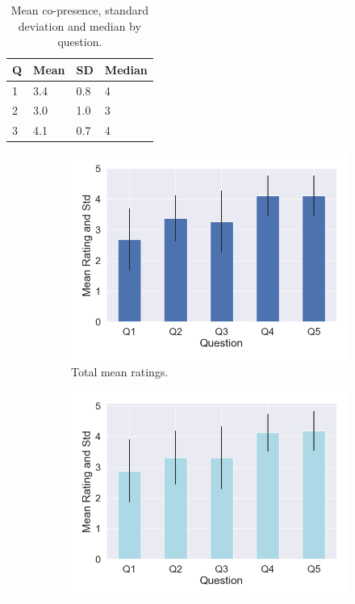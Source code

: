 \begin{table}
\centering
\begin{tabular}{|llll|}
\hline
Q & Mean & SD & Median \\
\hline
1 &  3.4 & 0.8&4\\  
2 &  3.0 & 1.0&3\\ 
3 &  4.1 & 0.7&4\\ 
\hline
\end{tabular}
\caption{Mean co-presence, standard deviation and median by question.}
\label{tbl:copres}
\end{table}
 
\pagebreak
\begin{figure}[H]
\hspace{-15mm}
\begin{subfigure}[b]{0.5\textwidth}
 \centering
 \includegraphics[scale=0.5]{Files/Plots/presence_mean_ratings.png}
 \caption{Total mean ratings. }
 \label{fig:presAllMean}
 \end{subfigure}
 \hspace{10mm}
\begin{subfigure}[b]{0.5\textwidth}
 \centering
 \includegraphics[scale=0.5]{Files/Plots/presence_mean_ratings_f.png}

\end{subfigure}
\end{figure}
